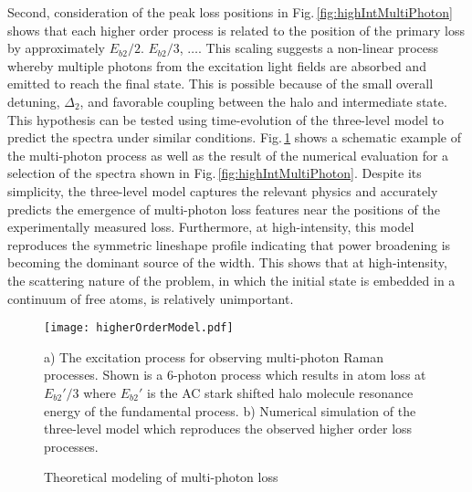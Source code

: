 Second, consideration of the peak loss positions in Fig.\,\ref{fig:highIntMultiPhoton} shows that each higher order process is related to the position of the primary loss by approximately $E_{b2}/2$. $E_{b2}/3$, $\dots$.
This scaling suggests a non-linear process whereby multiple photons from the excitation light fields are absorbed and emitted to reach the final state.
This is possible because of the small overall detuning, $\Delta_2$, and favorable coupling between the halo and intermediate state.
This hypothesis can be tested using time-evolution of the three-level model to predict the spectra under similar conditions.
Fig.\,\ref{fig:multiPhotonTheory} shows a schematic example of the multi-photon process as well as the result of the numerical evaluation for a selection of the spectra shown in Fig.\,\ref{fig:highIntMultiPhoton}.
Despite its simplicity, the three-level model captures the relevant physics and accurately predicts the emergence of multi-photon loss features near the positions of the experimentally measured loss.
Furthermore, at high-intensity, this model reproduces the symmetric lineshape profile indicating that power broadening is becoming the dominant source of the width.
This shows that at high-intensity, the scattering nature of the problem, in which the initial state is embedded in a continuum of free atoms, is relatively unimportant.
	\begin{figure} 
	\centerline{
	  \texttt{[image: higherOrderModel.pdf]}}
	  \caption{Theoretical modeling of multi-photon loss}{a) The excitation process for observing multi-photon Raman processes. Shown is a 6-photon process which results in atom loss at $E_{b2}'/3$ where $E_{b2}'$ is the AC stark shifted halo molecule resonance energy of the fundamental process. b) Numerical simulation of the three-level model which reproduces the observed higher order loss processes.}
	  \label{fig:multiPhotonTheory}
	\end{figure}




%
%
%
%
%
	

